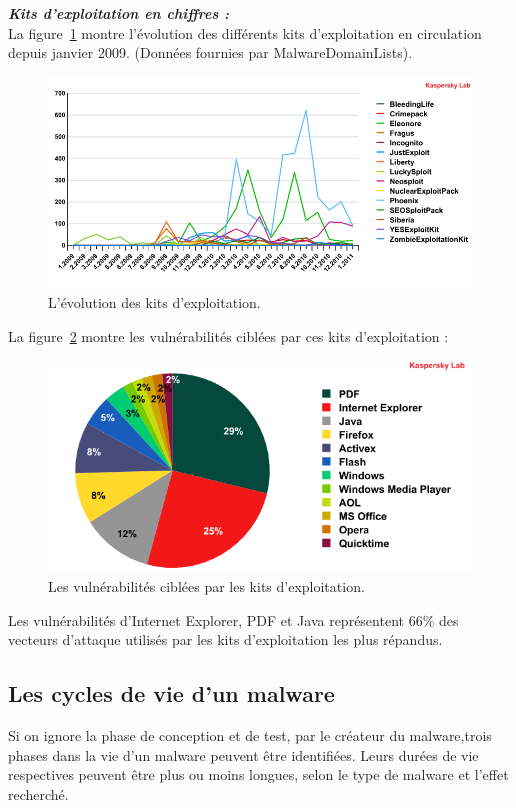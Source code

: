 \textbf{\textit{Kits d'exploitation en chiffres :}} \\
La figure~\ref{fig :kit} montre l'évolution des différents kits d'exploitation en circulation depuis janvier 2009. (Données fournies par MalwareDomainLists).
\begin{figure}[H]
\begin{center}
\includegraphics[scale=0.5]{Figures/kit.png}
\caption{L'évolution des kits d'exploitation.}
\label{fig :kit} 
\end{center}
\end{figure}
La figure~\ref{fig :kits} montre les vulnérabilités ciblées par ces kits d'exploitation :
\begin{figure}[H]
\begin{center}
\includegraphics[scale=0.5]{Figures/kits.png}
\caption{Les vulnérabilités ciblées par les kits d'exploitation.}
\label{fig :kits} 
\end{center}
\end{figure}
Les vulnérabilités d’Internet Explorer, PDF et Java représentent 66\% des vecteurs d'attaque utilisés par les kits d'exploitation les plus répandus.
\subsection{ Les cycles de vie d'un malware}
Si on ignore la phase de conception et de test, par le créateur du malware,trois phases dans la vie d'un malware peuvent être identifiées. Leurs durées de vie respectives peuvent être plus ou moins longues, selon le type de malware et l'effet recherché.
